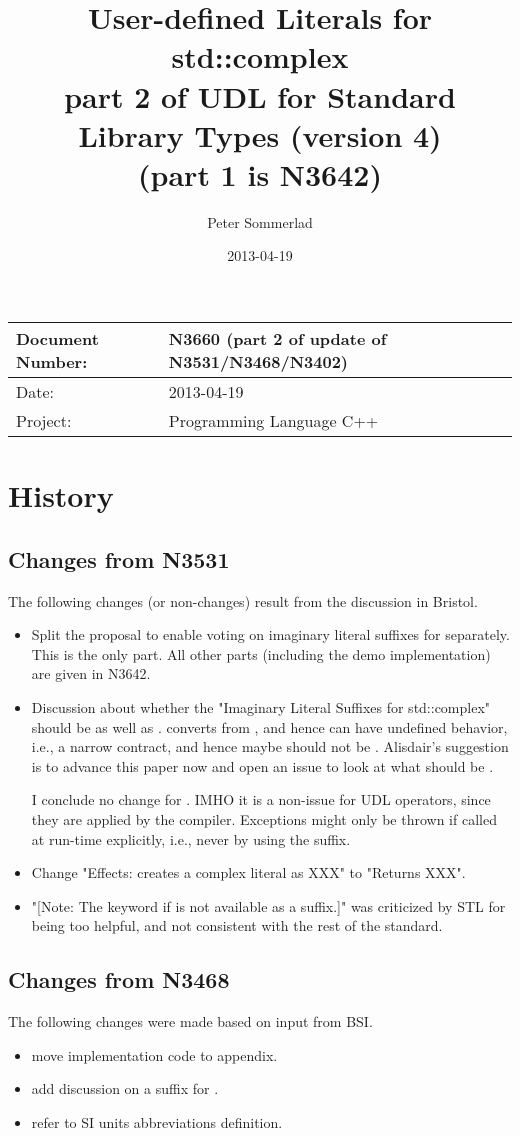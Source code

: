 \documentclass[ebook,11pt,article]{memoir}
\title{User-defined Literals for std::complex\\
{ part 2 of UDL for Standard Library Types (version 4)\\(part 1 is N3642) }
}
\author{Peter Sommerlad}
\date{2013-04-19}                                           %
\begin{document}
\maketitle
\begin{tabular}[t]{|l|l|}\hline 
Document Number: &  N3660 (part 2 of update of N3531/N3468/N3402)\\\hline
Date: & 2013-04-19 \\\hline
Project: & Programming Language C++\\\hline 
\end{tabular}
\chapter{History}
\section{Changes from N3531}
The following changes (or non-changes) result from the discussion in Bristol.
\begin{itemize}
\item Split the proposal to enable voting on imaginary literal suffixes for  separately. This is the  only part. All other parts (including the demo implementation) are given in N3642.
\item Discussion about whether the "Imaginary Literal Suffixes for std::complex" should be  as well as .    converts from , and hence can have undefined behavior, i.e., a narrow contract, and hence maybe should not be .  Alisdair’s suggestion is to advance this paper now and open an issue to look at what should be . 

I conclude no change for . IMHO it is a non-issue for  UDL operators, since they are applied by the compiler. Exceptions might only be thrown if called at run-time explicitly, i.e.,  never by using the suffix.
\item  Change "Effects: creates a complex literal as XXX" to "Returns XXX". %
\item "[Note: The keyword if is not available as a suffix.]" was criticized by STL for being too helpful, and not consistent with the rest of the standard. %
\end{itemize}

\section{Changes from N3468}
The following changes were made based on input from BSI.
\begin{itemize}
\item move implementation code to appendix.
\item add discussion on a suffix for .
\item refer to SI units abbreviations definition.
\end{itemize}
\end{document}
